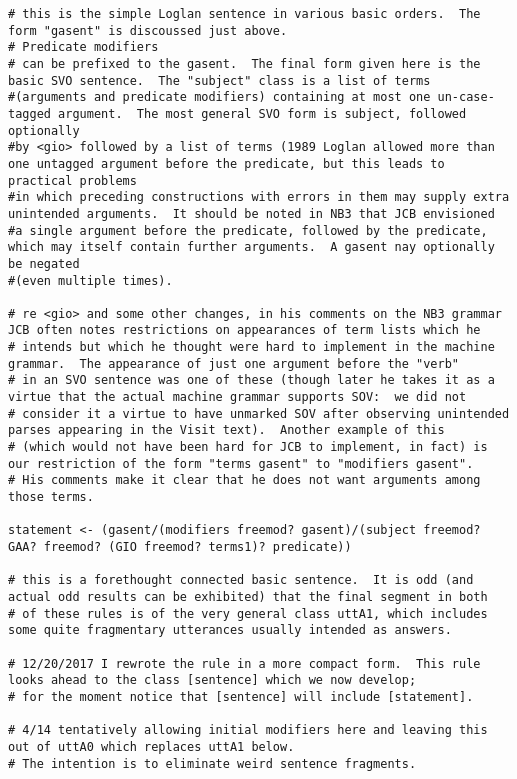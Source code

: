\documentclass[12pt]{book}
\begin{document}
{\begin{verbatim}
# this is the simple Loglan sentence in various basic orders.  The form "gasent" is discoussed just above.  
# Predicate modifiers
# can be prefixed to the gasent.  The final form given here is the basic SVO sentence.  The "subject" class is a list of terms
#(arguments and predicate modifiers) containing at most one un-case-tagged argument.  The most general SVO form is subject, followed optionally
#by <gio> followed by a list of terms (1989 Loglan allowed more than one untagged argument before the predicate, but this leads to practical problems
#in which preceding constructions with errors in them may supply extra unintended arguments.  It should be noted in NB3 that JCB envisioned
#a single argument before the predicate, followed by the predicate, which may itself contain further arguments.  A gasent nay optionally be negated
#(even multiple times).

# re <gio> and some other changes, in his comments on the NB3 grammar  JCB often notes restrictions on appearances of term lists which he
# intends but which he thought were hard to implement in the machine grammar.  The appearance of just one argument before the "verb"
# in an SVO sentence was one of these (though later he takes it as a virtue that the actual machine grammar supports SOV:  we did not
# consider it a virtue to have unmarked SOV after observing unintended parses appearing in the Visit text).  Another example of this
# (which would not have been hard for JCB to implement, in fact) is our restriction of the form "terms gasent" to "modifiers gasent".
# His comments make it clear that he does not want arguments among those terms.

statement <- (gasent/(modifiers freemod? gasent)/(subject freemod? GAA? freemod? (GIO freemod? terms1)? predicate))

# this is a forethought connected basic sentence.  It is odd (and actual odd results can be exhibited) that the final segment in both
# of these rules is of the very general class uttA1, which includes some quite fragmentary utterances usually intended as answers.

# 12/20/2017 I rewrote the rule in a more compact form.  This rule looks ahead to the class [sentence] which we now develop;
# for the moment notice that [sentence] will include [statement].

# 4/14 tentatively allowing initial modifiers here and leaving this out of uttA0 which replaces uttA1 below.
# The intention is to eliminate weird sentence fragments.


\end{verbatim}}
\end{document}
